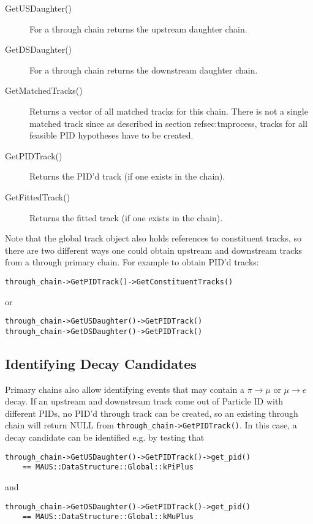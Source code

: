 \begin{description}
  \item [GetUSDaughter()] For a through chain returns the upstream daughter chain.
  \item [GetDSDaughter()] For a through chain returns the downstream daughter chain.
  \item [GetMatchedTracks()] Returns a vector of all matched tracks for this chain. There is not a single matched track since as described in section ref{sec:tmprocess},
        tracks for all feasible PID hypotheses have to be created.
  \item [GetPIDTrack()] Returns the PID'd track (if one exists in the chain).
  \item [GetFittedTrack()] Returns the fitted track (if one exists in the chain).
\end{description}

Note that the global track object also holds references to constituent tracks, so there are two different
ways one could obtain upstream and downstream tracks from a through primary chain. For example to obtain PID'd tracks:
\begin{verbatim}
through_chain->GetPIDTrack()->GetConstituentTracks()
\end{verbatim}
or
\begin{verbatim}
through_chain->GetUSDaughter()->GetPIDTrack()
through_chain->GetDSDaughter()->GetPIDTrack()
\end{verbatim}

\subsection{Identifying Decay Candidates}\label{subsec:decay_candidates}

Primary chains also allow identifying events that may contain a $\pi \rightarrow \mu$ or $\mu \rightarrow e$ decay. If an upstream
and downstream track come out of Particle ID with different PIDs, no PID'd through track can be created, so an existing through
chain will return NULL from \texttt{through\_chain->GetPIDTrack()}. In this case, a decay candidate can be identified e.g. by testing that
\begin{verbatim}
through_chain->GetUSDaughter()->GetPIDTrack()->get_pid()
    == MAUS::DataStructure::Global::kPiPlus
\end{verbatim}
and
\begin{verbatim}
through_chain->GetDSDaughter()->GetPIDTrack()->get_pid()
    == MAUS::DataStructure::Global::kMuPlus
\end{verbatim}

